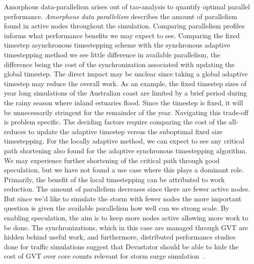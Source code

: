 Amorphous data-parallelism arises out of tao-analysis to quantify optimal parallel performance. {\em Amorphous data parallelism} describes the amount of parallelism found in active nodes throughout the simulation. Comparing parallelism profiles informs what performance benefits we may expect to see. Comparing the fixed timestep asynchronous timestepping scheme with the synchronous adaptive timestepping method we see little difference in available parallelism, the difference being the cost of the synchronization associated with updating the global timestep. The direct impact may be unclear since taking a global adaptive timestep may reduce the overall work. As an example, the fixed timestep sizes of year long simulations of the Australian coast are limited by a brief period during the rainy season where inland estuaries flood. Since the timestep is fixed, it will be unnecessarily stringent for the remainder of the year.
 Navigating this trade-off is problem specific. The deciding factors require comparing the cost of the all-reduces to update the adaptive timestep versus the suboptimal fixed size timestepping. 
  For the locally adaptive method, we can expect to see any critical path shortening also found for the adaptive synchronous timestepping algorithm. We may experience further shortening of the critical path through good speculation, but we have not found a use case where this plays a dominant role. Primarily, the benefit of the local timestepping can be attributed to work reduction. The amount of parallelism decreases since there are fewer active nodes. But since we'd like to simulate the storm with fewer nodes the more important question is given the available parallelism how well can we strong scale. By enabling speculation, the aim is to keep more nodes active allowing more work to be done. The synchronizations, which in this case are managed through GVT are hidden behind useful work, and furthermore, distributed performance studies done for traffic simulations suggest that Devastator should be able to hide the cost of GVT over core counts relevant for storm surge simulation~\cite{Chan2018}. 
  


